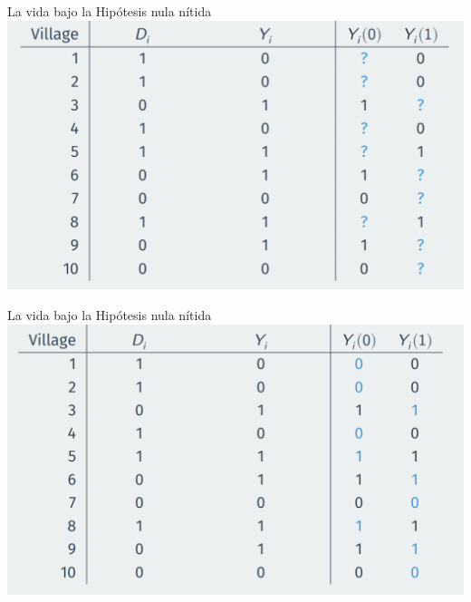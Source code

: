 \documentclass[
  ignorenonframetext,
]{beamer}
\begin{document}
\begin{frame}{La vida bajo la Hipótesis nula nítida}
\protect\hypertarget{la-vida-bajo-la-hipuxf3tesis-nula-nuxedtida}{}
\includegraphics{figs/villages_po}
\end{frame}

\begin{frame}{La vida bajo la Hipótesis nula nítida}
\protect\hypertarget{la-vida-bajo-la-hipuxf3tesis-nula-nuxedtida-1}{}
\includegraphics{figs/villages_po2}
\end{frame}
\end{document}
